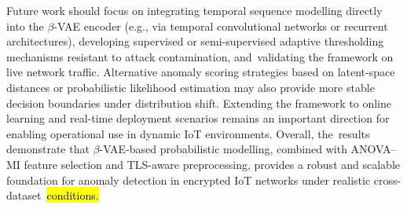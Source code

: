 \documentclass[futureinternet,article,accept,moreauthors]{Definitions/mdpi}
\begin{document}
Future work should focus on integrating temporal sequence modelling directly into the $\beta$-VAE encoder (e.g., via temporal convolutional networks or recurrent architectures), developing supervised or semi-supervised adaptive thresholding mechanisms resistant to attack contamination, and~validating the framework on live network traffic. Alternative anomaly scoring strategies based on latent-space distances or probabilistic likelihood estimation may also provide more stable decision boundaries under distribution shift. Extending the framework to online learning and real-time deployment scenarios remains an important direction for enabling operational use in dynamic IoT environments. Overall, the~results demonstrate that $\beta$-VAE-based probabilistic modelling, combined with ANOVA--MI feature selection and TLS-aware preprocessing, provides a robust and scalable foundation for anomaly detection in encrypted IoT networks under realistic cross-dataset~\hl{conditions.} %


%

\vspace{6pt}





\end{document}
